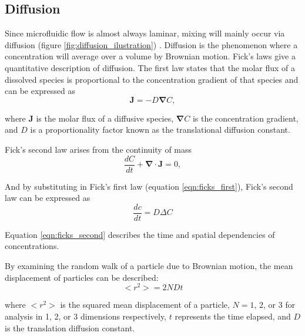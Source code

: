 \subsection*{Diffusion}

\par Since microfluidic flow is almost always laminar, mixing will mainly occur via diffusion (figure \ref{fig:diffusion_ilustration}) \cite{david_j._beebe_physics_2002}. Diffusion is the phenomenon where a concentration will average over a volume by Brownian motion. Fick's laws give a quantitative description of diffusion. The first law states that the molar flux of a dissolved species is proportional to the concentration gradient of that species and can be expressed as 
\begin{equation}
    \boldsymbol{J} = -D \boldsymbol{\nabla}C,
    \label{eqn:ficks_first}
\end{equation}

\noindent where $\boldsymbol{J}$ is the molar flux of a diffusive species, $\boldsymbol{\nabla}C$ is the concentration gradient, and $D$ is a proportionality factor known as the translational diffusion constant.

\par Fick's second law arises from the continuity of mass
\begin{equation}
    \frac{dC}{dt} + \boldsymbol{\nabla} \cdot \boldsymbol{J} = 0,
\end{equation}

\noindent And by substituting in Fick's first law (equation \ref{eqn:ficks_first}), Fick's second law can be expressed as 
\begin{equation}
    \frac{dc}{dt} = D\Delta C
    \label{eqn:ficks_second}
\end{equation}

\noindent Equation \ref{eqn:ficks_second} describes the time and spatial dependencies of concentrations.

\par By examining the random walk of a particle due to Brownian motion, the mean displacement of particles can be described:
\begin{equation}
    \Big< r^2 \Big> = 2 N D t
\end{equation}

\noindent where $<r^2>$ is the squared mean displacement of a particle, $N = 1$, $2$, or $3$ for analysis in 1, 2, or 3 dimensions respectively, $t$ represents the time elapsed, and $D$ is the translation diffusion constant. 

